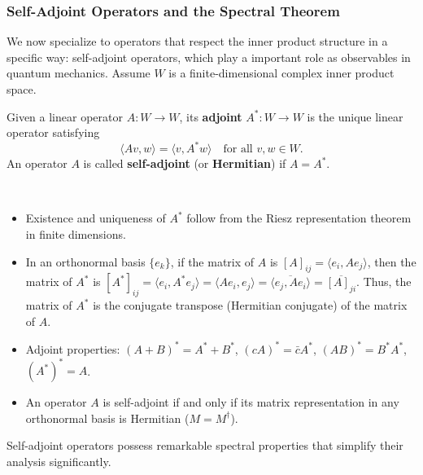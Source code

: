 \subsubsection{Self-Adjoint Operators and the Spectral Theorem}
\label{subsec:self_adjoint}

We now specialize to operators that respect the inner product structure in a specific way: self-adjoint operators, which play a important role as observables in quantum mechanics. Assume $W$ is a finite-dimensional complex inner product space.

\begin{definition}
Given a linear operator $A: W \to W$, its \textbf{adjoint} $A^*: W \to W$ is the unique linear operator satisfying
\[ \langle Av, w \rangle = \langle v, A^*w \rangle \quad \text{for all } v, w \in W. \]
An operator $A$ is called \textbf{self-adjoint} (or \textbf{Hermitian}) if $A = A^*$.
\end{definition}

\begin{remark}
\,
\begin{itemize}
    \item Existence and uniqueness of $A^*$ follow from the Riesz representation theorem in finite dimensions.
    \item In an orthonormal basis $\{e_k\}$, if the matrix of $A$ is $[A]_{ij} = \langle e_i, A e_j \rangle$, then the matrix of $A^*$ is $[A^*]_{ij} = \langle e_i, A^* e_j \rangle = \langle A e_i, e_j \rangle = \overline{\langle e_j, A e_i \rangle} = \overline{[A]_{ji}}$. Thus, the matrix of $A^*$ is the conjugate transpose (Hermitian conjugate) of the matrix of $A$.
    \item Adjoint properties: $(A+B)^* = A^*+B^*$, $(cA)^* = \bar{c}A^*$, $(AB)^* = B^*A^*$, $(A^*)^* = A$.
    \item An operator $A$ is self-adjoint if and only if its matrix representation in any orthonormal basis is Hermitian ($M = M^\dagger$).
\end{itemize}
\end{remark}

Self-adjoint operators possess remarkable spectral properties that simplify their analysis significantly.

